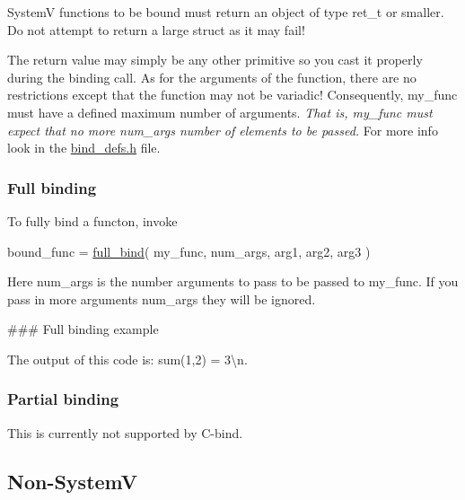 SystemV functions to be bound must return an object of type {\ttfamily ret\+\_\+t} or smaller. Do not attempt to return a large struct as it may fail!

The return value may simply be any other primitive so you cast it properly during the binding call. As for the arguments of the function, there are no restrictions except that the function may not be variadic! Consequently, {\ttfamily my\+\_\+func} must have a defined maximum number of \textquotesingle{}arguments\textquotesingle{}. {\itshape That is, {\ttfamily my\+\_\+func} must expect that no more {\ttfamily num\+\_\+args} number of elements to be passed.} For more info look in the {\ttfamily \hyperlink{bind__defs_8h}{bind\+\_\+defs.\+h}} file.

\subsubsection*{Full binding}

To fully bind a functon, invoke 
\begin{DoxyCode}
bound\_func = \hyperlink{bind_8c_aba8492ffd71864427a5cddc0c3888454}{full\_bind}( my\_func, num\_args, arg1, arg2, arg3 )
\end{DoxyCode}
 Here {\ttfamily num\+\_\+args} is the number arguments to pass to be passed to {\ttfamily my\+\_\+func}. If you pass in more arguments {\ttfamily num\+\_\+args} they will be ignored.

\#\#\# Full binding example 
 The output of this code is\+: {\ttfamily sum(1,2) = 3\textbackslash{}n}.

\subsubsection*{Partial binding}

This is currently not supported by {\ttfamily C-\/bind}.

\subsection*{Non-\/\+SystemV}

